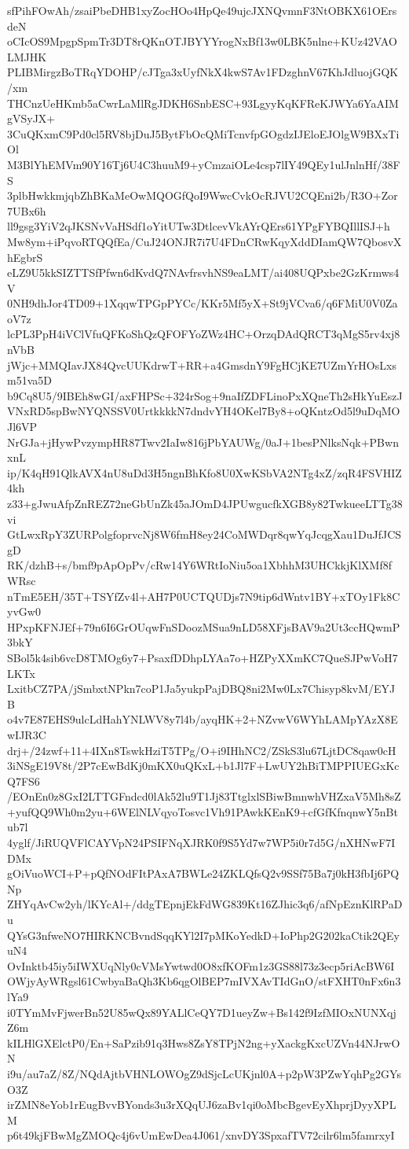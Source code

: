 sfPihFOwAh/zsaiPbeDHB1xyZocHOo4HpQe49ujcJXNQvmnF3NtOBKX61OErsdeN
oCIcOS9MpgpSpmTr3DT8rQKnOTJBYYYrogNxBf13w0LBK5nlne+KUz42VAOLMJHK
PLIBMirgzBoTRqYDOHP/cJTga3xUyfNkX4kwS7Av1FDzghnV67KhJdluojGQK/xm
THCnzUeHKmb5aCwrLaMlRgJDKH6SnbESC+93LgyyKqKFReKJWYa6YaAIMgVSyJX+
3CuQKxmC9Pd0cl5RV8bjDuJ5BytFbOcQMiTcnvfpGOgdzIJEloEJOlgW9BXxTiOl
M3BlYhEMVm90Y16Tj6U4C3huuM9+yCmzaiOLe4csp7lIY49QEy1ulJnlnHf/38FS
3plbHwkkmjqbZhBKaMeOwMQOGfQoI9WwcCvkOcRJVU2CQEni2b/R3O+Zor7UBx6h
ll9gsg3YiV2qJKSNvVaHSdf1oYitUTw3DtlcevVkAYrQErs61YPgFYBQIllISJ+h
Mw8ym+iPqvoRTQQfEa/CuJ24ONJR7i7U4FDnCRwKqyXddDIamQW7QbosvXhEgbrS
eLZ9U5kkSIZTTSfPfwn6dKvdQ7NAvfrsvhNS9eaLMT/ai408UQPxbe2GzKrmws4V
0NH9dhJor4TD09+1XqqwTPGpPYCc/KKr5Mf5yX+St9jVCva6/q6FMiU0V0ZaoV7z
lcPL3PpH4iVClVfuQFKoShQzQFOFYoZWz4HC+OrzqDAdQRCT3qMgS5rv4xj8nVbB
jWjc+MMQIavJX84QvcUUKdrwT+RR+a4GmsdnY9FgHCjKE7UZmYrHOsLxsm51va5D
b9Cq8U5/9IBEh8wGI/axFHPSc+324rSog+9naIfZDFLinoPxXQneTh2sHkYuEszJ
VNxRD5spBwNYQNSSV0UrtkkkkN7dndvYH4OKel7By8+oQKntzOd5l9uDqMOJl6VP
NrGJa+jHywPvzympHR87Twv2IaIw816jPbYAUWg/0aJ+1besPNlksNqk+PBwnxnL
ip/K4qH91QlkAVX4nU8uDd3H5ngnBhKfo8U0XwKSbVA2NTg4xZ/zqR4FSVHIZ4kh
z33+gJwuAfpZnREZ72neGbUnZk45aJOmD4JPUwgucfkXGB8y82TwkueeLTTg38vi
GtLwxRpY3ZURPolgfoprvcNj8W6fmH8ey24CoMWDqr8qwYqJcqgXau1DuJfJCSgD
RK/dzhB+s/bmf9pApOpPv/cRw14Y6WRtIoNiu5oa1XbhhM3UHCkkjKlXMf8fWRsc
nTmE5EH/35T+TSYfZv4l+AH7P0UCTQUDjs7N9tip6dWntv1BY+xTOy1Fk8CyvGw0
HPxpKFNJEf+79n6I6GrOUqwFnSDoozMSua9nLD58XFjsBAV9a2Ut3ccHQwmP3bkY
SBol5k4sib6vcD8TMOg6y7+PsaxfDDhpLYAa7o+HZPyXXmKC7QueSJPwVoH7LKTx
LxitbCZ7PA/jSmbxtNPkn7coP1Ja5yukpPajDBQ8ni2Mw0Lx7Chisyp8kvM/EYJB
o4v7E87EHS9ulcLdHahYNLWV8y7l4b/ayqHK+2+NZvwV6WYhLAMpYAzX8EwIJR3C
drj+/24zwf+11+4IXn8TswkHziT5TPg/O+i9IHhNC2/ZSkS3lu67LjtDC8qaw0cH
3iNSgE19V8t/2P7cEwBdKj0mKX0uQKxL+b1Jl7F+LwUY2hBiTMPPIUEGxKcQ7FS6
/EOnEn0z8GxI2LTTGFndcd0lAk52lu9T1Jj83TtglxlSBiwBmnwhVHZxaV5Mh8sZ
+yufQQ9Wh0m2yu+6WElNLVqyoTosvc1Vh91PAwkKEnK9+cfGfKfnqnwY5nBtub7l
4yglf/JiRUQVFlCAYVpN24PSIFNqXJRK0f9S5Yd7w7WP5i0r7d5G/nXHNwF7IDMx
gOiVuoWCI+P+pQfNOdFItPAxA7BWLe24ZKLQfsQ2v9SSf75Ba7j0kH3fbIj6PQNp
ZHYqAvCw2yh/lKYcAl+/ddgTEpnjEkFdWG839Kt16ZJhic3q6/afNpEznKlRPaDu
QYsG3nfweNO7HIRKNCBvndSqqKYl2I7pMKoYedkD+IoPhp2G202kaCtik2QEyuN4
OvInktb45iy5iIWXUqNly0cVMsYwtwd0O8xfKOFm1z3GS88l73z3ecp5riAcBW6I
OWjyAyWRgsl61CwbyaBaQh3Kb6qgOlBEP7mIVXAvTIdGnO/stFXHT0nFx6n3lYa9
i0TYmMvFjwerBn52U85wQx89YALlCeQY7D1ueyZw+Bs142f9IzfMIOxNUNXqjZ6m
kILHlGXElctP0/En+SaPzib91q3Hws8ZsY8TPjN2ng+yXackgKxcUZVn44NJrwON
i9u/au7aZ/8Z/NQdAjtbVHNLOWOgZ9dSjcLcUKjnl0A+p2pW3PZwYqhPg2GYsO3Z
irZMN8eYob1rEugBvvBYonds3u3rXQqUJ6zaBv1qi0oMbcBgevEyXhprjDyyXPLM
p6t49kjFBwMgZMOQc4j6vUmEwDea4J061/xnvDY3SpxafTV72cilr6lm5famrxyI
